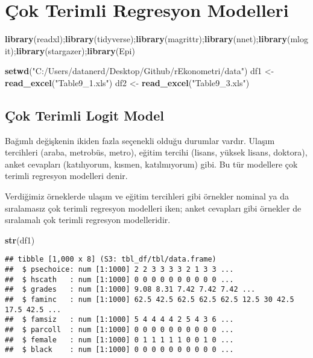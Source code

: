 \documentclass[
]{book}
\newenvironment{Shaded}{\begin{snugshade}}{\end{snugshade}}
\newcommand{\KeywordTok}[1]{\textcolor[rgb]{0.13,0.29,0.53}{\textbf{#1}}}
\newcommand{\NormalTok}[1]{#1}
\newcommand{\StringTok}[1]{\textcolor[rgb]{0.31,0.60,0.02}{#1}}
\begin{document}
\hypertarget{uxe7ok-terimli-regresyon-modelleri}{%
\chapter{Çok Terimli Regresyon Modelleri}\label{uxe7ok-terimli-regresyon-modelleri}}

\begin{Shaded}
\begin{Highlighting}[]
\KeywordTok{library}\NormalTok{(readxl);}\KeywordTok{library}\NormalTok{(tidyverse);}\KeywordTok{library}\NormalTok{(magrittr);}\KeywordTok{library}\NormalTok{(nnet);}\KeywordTok{library}\NormalTok{(mlogit);}\KeywordTok{library}\NormalTok{(stargazer);}\KeywordTok{library}\NormalTok{(Epi)}

\KeywordTok{setwd}\NormalTok{(}\StringTok{"C:/Users/datanerd/Desktop/Github/rEkonometri/data"}\NormalTok{)}
\NormalTok{df1 <-}\StringTok{ }\KeywordTok{read_excel}\NormalTok{(}\StringTok{"Table9_1.xls"}\NormalTok{)}
\NormalTok{df2 <-}\StringTok{ }\KeywordTok{read_excel}\NormalTok{(}\StringTok{"Table9_3.xls"}\NormalTok{)}
\end{Highlighting}
\end{Shaded}

\hypertarget{uxe7ok-terimli-logit-model}{%
\section{Çok Terimli Logit Model}\label{uxe7ok-terimli-logit-model}}

Bağımlı değişkenin ikiden fazla seçenekli olduğu durumlar vardır. Ulaşım tercihleri (araba, metrobüs, metro), eğitim tercihi (lisans, yüksek lisans, doktora), anket cevapları (katılıyorum, kısmen, katılmıyorum) gibi. Bu tür modellere çok terimli regresyon modelleri denir.

Verdiğimiz örneklerde ulaşım ve eğitim tercihleri gibi örnekler nominal ya da sıralamasız çok terimli regresyon modelleri iken; anket cevapları gibi örnekler de sıralamalı çok terimli regresyon modelleridir.

\begin{Shaded}
\begin{Highlighting}[]
\KeywordTok{str}\NormalTok{(df1)}
\end{Highlighting}
\end{Shaded}

\begin{verbatim}
## tibble [1,000 x 8] (S3: tbl_df/tbl/data.frame)
##  $ psechoice: num [1:1000] 2 2 3 3 3 3 2 1 3 3 ...
##  $ hscath   : num [1:1000] 0 0 0 0 0 0 0 0 0 0 ...
##  $ grades   : num [1:1000] 9.08 8.31 7.42 7.42 7.42 ...
##  $ faminc   : num [1:1000] 62.5 42.5 62.5 62.5 62.5 12.5 30 42.5 17.5 42.5 ...
##  $ famsiz   : num [1:1000] 5 4 4 4 4 2 5 4 3 6 ...
##  $ parcoll  : num [1:1000] 0 0 0 0 0 0 0 0 0 0 ...
##  $ female   : num [1:1000] 0 1 1 1 1 1 0 0 1 0 ...
##  $ black    : num [1:1000] 0 0 0 0 0 0 0 0 0 0 ...
\end{verbatim}
\end{document}
